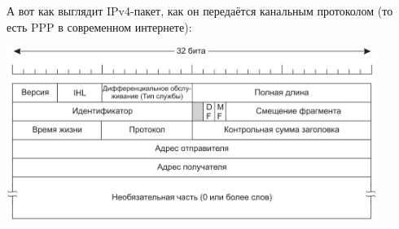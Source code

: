 \documentclass{../../text-style}
\begin{document}
А вот как выглядит IPv4-пакет, как он передаётся канальным протоколом (то есть PPP в современном интернете):

\begin{center}
    \includegraphics[width=0.9\textwidth]{ipv4.png}
\end{center}
\end{document}
